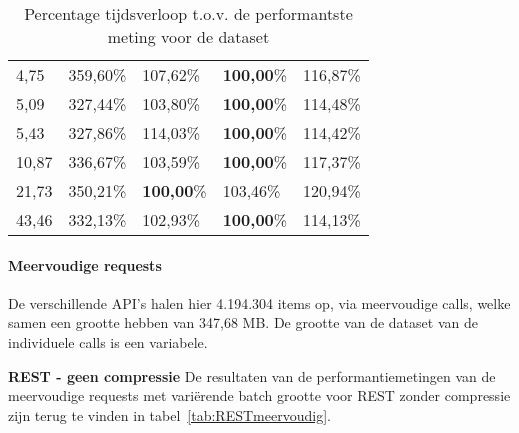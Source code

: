 \begin{table}
\begin{tabular}{lllll}
        4,75 & 359,60\% & 107,62\% & \textbf{100,00}\% & 116,87\% \\
        5,09 & 327,44\% & 103,80\% & \textbf{100,00}\% & 114,48\% \\
        5,43 & 327,86\% & 114,03\% & \textbf{100,00}\% & 114,42\% \\
        10,87 & 336,67\% & 103,59\% & \textbf{100,00}\% & 117,37\% \\
        21,73 & 350,21\% & \textbf{100,00}\% & 103,46\% & 120,94\% \\
        43,46 & 332,13\% & 102,93\% & \textbf{100,00}\% & 114,13\% \\
        \bottomrule
    \end{tabular}
    \caption{Percentage tijdsverloop t.o.v. de performantste meting voor de dataset}
    \label{tab:REST_RESTcompressie_gRPCUni_gRPCMultipercentage}
\end{table}


\paragraph{Meervoudige requests}

De verschillende API's halen hier 4.194.304 items op, via meervoudige calls, welke samen een grootte hebben van 347,68 MB. De grootte van de dataset van de individuele calls
is een variabele.

\textbf{REST - geen compressie}\newline
De resultaten van de performantiemetingen van de meervoudige requests met vari\"erende batch grootte voor REST zonder compressie zijn terug te vinden in tabel~\ref{tab:RESTmeervoudig}.

